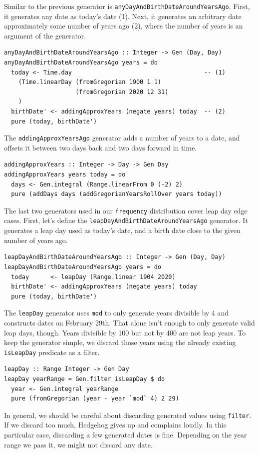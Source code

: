 Similar to the previous generator is
\texttt{anyDayAndBirthDateAroundYearsAgo}. First, it generates any date
as today's date (1). Next, it generates an arbitrary date approximately
some number of years ago (2), where the number of years is an argument
of the generator.

\begin{verbatim}
anyDayAndBirthDateAroundYearsAgo :: Integer -> Gen (Day, Day)
anyDayAndBirthDateAroundYearsAgo years = do
  today <- Time.day                                     -- (1)
    (Time.linearDay (fromGregorian 1900 1 1)
                    (fromGregorian 2020 12 31)
    )
  birthDate' <- addingApproxYears (negate years) today  -- (2)
  pure (today, birthDate')
\end{verbatim}
The \texttt{addingApproxYearsAgo} generator adds a number of years to a
date, and offsets it between two days back and two days forward in time.

\begin{verbatim}
addingApproxYears :: Integer -> Day -> Gen Day
addingApproxYears years today = do
  days <- Gen.integral (Range.linearFrom 0 (-2) 2)
  pure (addDays days (addGregorianYearsRollOver years today))
\end{verbatim}
The last two generators used in our \texttt{frequency} distribution
cover leap day edge cases. First, let's define the
\texttt{leapDayAndBirthDateAroundYearsAgo} generator. It generates a
leap day used as today's date, and a birth date close to the given
number of years ago.

\begin{verbatim}
leapDayAndBirthDateAroundYearsAgo :: Integer -> Gen (Day, Day)
leapDayAndBirthDateAroundYearsAgo years = do
  today      <- leapDay (Range.linear 1904 2020)
  birthDate' <- addingApproxYears (negate years) today
  pure (today, birthDate')
\end{verbatim}
The \texttt{leapDay} generator uses \texttt{mod} to only generate years
divisible by 4 and constructs dates on February 29th. That alone isn't
enough to only generate valid leap days, though. Years divisible by 100
but not by 400 are not leap years. To keep the generator simple, we
discard those years using the already existing \texttt{isLeapDay}
predicate as a filter.

\begin{verbatim}
leapDay :: Range Integer -> Gen Day
leapDay yearRange = Gen.filter isLeapDay $ do
  year <- Gen.integral yearRange
  pure (fromGregorian (year - year `mod` 4) 2 29)
\end{verbatim}
In general, we should be careful about discarding generated values using
\texttt{filter}. If we discard too much, Hedgehog gives up and complains
loudly. In this particular case, discarding a few generated dates is
fine. Depending on the year range we pass it, we might not discard any
date.

